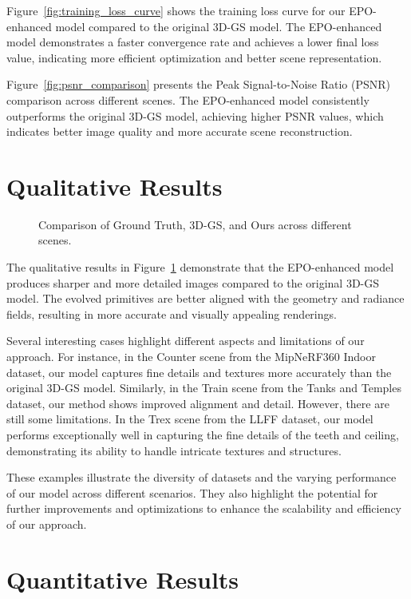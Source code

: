 \documentclass[11pt]{report}
\begin{document}
Figure~\ref{fig:training_loss_curve} shows the training loss curve for our EPO-enhanced model compared to the original 3D-GS model. The EPO-enhanced model demonstrates a faster convergence rate and achieves a lower final loss value, indicating more efficient optimization and better scene representation.

Figure~\ref{fig:psnr_comparison} presents the Peak Signal-to-Noise Ratio (PSNR) comparison across different scenes. The EPO-enhanced model consistently outperforms the original 3D-GS model, achieving higher PSNR values, which indicates better image quality and more accurate scene reconstruction.

\section{Qualitative Results}

\begin{figure}[htbp]
    \centering
    
    \caption{Comparison of Ground Truth, 3D-GS, and Ours across different scenes.}
    \label{fig:comparison}
\end{figure}

The qualitative results in Figure~\ref{fig:comparison} demonstrate that the EPO-enhanced model produces sharper and more detailed images compared to the original 3D-GS model. The evolved primitives are better aligned with the geometry and radiance fields, resulting in more accurate and visually appealing renderings.

Several interesting cases highlight different aspects and limitations of our approach. For instance, in the Counter scene from the MipNeRF360 Indoor dataset, our model captures fine details and textures more accurately than the original 3D-GS model. Similarly, in the Train scene from the Tanks and Temples dataset, our method shows improved alignment and detail. However, there are still some limitations. In the Trex scene from the LLFF dataset, our model performs exceptionally well in capturing the fine details of the teeth and ceiling, demonstrating its ability to handle intricate textures and structures. 

These examples illustrate the diversity of datasets and the varying performance of our model across different scenarios. They also highlight the potential for further improvements and optimizations to enhance the scalability and efficiency of our approach.

\section{Quantitative Results}
\end{document}

